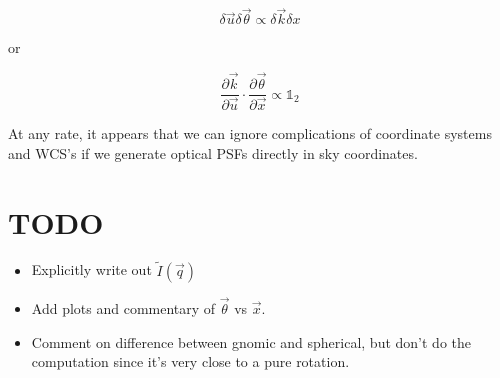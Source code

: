 \documentclass{article}
\begin{document}
\begin{equation}
    \delta \vec{u} \delta \vec{\theta} \propto \delta \vec{k} \delta {x}
\end{equation}

or

\begin{equation}
    \frac{\partial \vec{k}}{\partial \vec{u}} \cdot \frac{\partial \vec{\theta}}{\partial \vec{x}} \propto \mathbb{1}_2
\end{equation}

At any rate, it appears that we can ignore complications of coordinate systems and WCS's if we
generate optical PSFs directly in sky coordinates.

\section{TODO}

\begin{itemize}
    \item Explicitly write out $\tilde{I}\left(\vec{q}\right)$
    \item Add plots and commentary of $\vec{\theta}$ vs $\vec{x}$.
    \item Comment on difference between gnomic and spherical, but don't do the computation since
          it's very close to a pure rotation.
\end{itemize}
\end{document}
